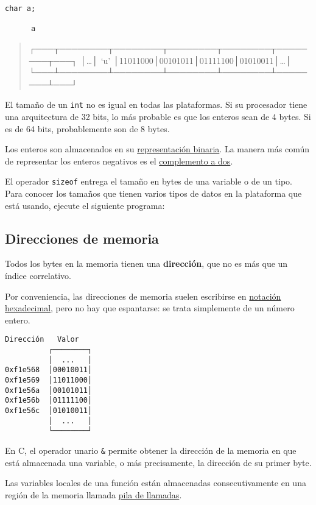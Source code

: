 \begin{lstlisting}
char a;

      a
\end{lstlisting}

\begin{quote}
┌───┬────────┬────────┬────────┬────────┬────────┬───┐ │\ldots{}│ `u'
│11011000│00101011│01111100│01010011│\ldots{}│
└───┴────────┴────────┴────────┴────────┴────────┴───┘
\end{quote}

El tamaño de un \lstinline!int! no es igual en todas las plataformas. Si
su procesador tiene una arquitectura de 32 bits, lo más probable es que
los enteros sean de 4 bytes. Si es de 64 bits, probablemente son de 8
bytes.

Los enteros son almacenados en su
\href{http://en.wikipedia.org/wiki/Binary\_numeral\_system}{representación
binaria}. La manera más común de representar los enteros negativos es el
\href{http://en.wikipedia.org/wiki/Two's\_complement}{complemento a
dos}.

El operador \lstinline!sizeof! entrega el tamaño en bytes de una
variable o de un tipo. Para conocer los tamaños que tienen varios tipos
de datos en la plataforma que está usando, ejecute el siguiente
programa:

\subsection{Direcciones de memoria}

Todos los bytes en la memoria tienen una \textbf{dirección}, que no es
más que un índice correlativo.

Por conveniencia, las direcciones de memoria suelen escribirse en
\href{http://en.wikipedia.org/wiki/Hexadecimal}{notación hexadecimal},
pero no hay que espantarse: se trata simplemente de un número entero.

\begin{lstlisting}
Dirección   Valor
          ┌────────┐
          │  ...   │
0xf1e568  │00010011│
0xf1e569  │11011000│
0xf1e56a  │00101011│
0xf1e56b  │01111100│
0xf1e56c  │01010011│
          │  ...   │
          └────────┘
\end{lstlisting}

En C, el operador unario \lstinline!&! permite obtener la dirección de
la memoria en que está almacenada una variable, o más precisamente, la
dirección de su primer byte.

Las variables locales de una función están almacenadas consecutivamente
en una región de la memoria llamada
\href{http://es.wikipedia.org/wiki/Pila\_de\_llamadas}{pila de
llamadas}.


